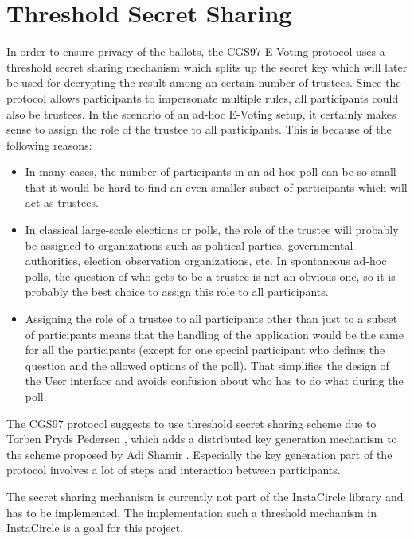 \documentclass[numbers=noenddot, abstract=on, a4paper, headsepline,
footsepline, oneside, draft=off]{scrreprt}
\begin{document}
\section{Threshold Secret Sharing}
\label{sec:thresholdsecretsharing}
In order to ensure privacy of the ballots, the CGS97 \cite{CGS97} E-Voting
protocol uses a threshold secret sharing mechanism which splits up the secret
key which will later be used for decrypting the result among an certain number
of trustees. Since the protocol allows participants to impersonate multiple
rules, all participants could also be trustees. In the scenario of an ad-hoc
E-Voting setup, it certainly makes sense to assign the role of the trustee to
all participants. This is because of the following reasons:
\begin{itemize}
  \item In many cases, the number of participants in an ad-hoc poll can be so
  small that it would be hard to find an even smaller subset of participants
  which will act as trustees.
  \item In classical large-scale elections or polls, the role of the trustee
  will probably be assigned to organizations such as political parties,
  governmental authorities, election observation organizations, etc. In
  spontaneous ad-hoc polls, the question of who gets to be a trustee is not an
  obvious one, so it is probably the best choice to assign this role to all
  participants.
  \item Assigning the role of a trustee to all participants other than just to a
  subset of participants means that the handling of the application would be the
  same for all the participants (except for one special participant who defines
  the question and the allowed options of the poll). That simplifies the design
  of the User interface and avoids confusion about who has to do what during the
  poll.
\end{itemize}

The CGS97 protocol suggests to use threshold secret sharing scheme due to Torben
Pryds Pedersen \cite{PED91}, which adds a distributed key generation mechanism to the
scheme proposed by Adi Shamir \cite{Shamir79}. Especially the key generation
part of the protocol involves a lot of steps and interaction between participants.

The secret sharing mechanism is currently not part of the InstaCircle library
and has to be implemented. The implementation such a threshold mechanism in
InstaCircle is a goal for this project.
\end{document}
